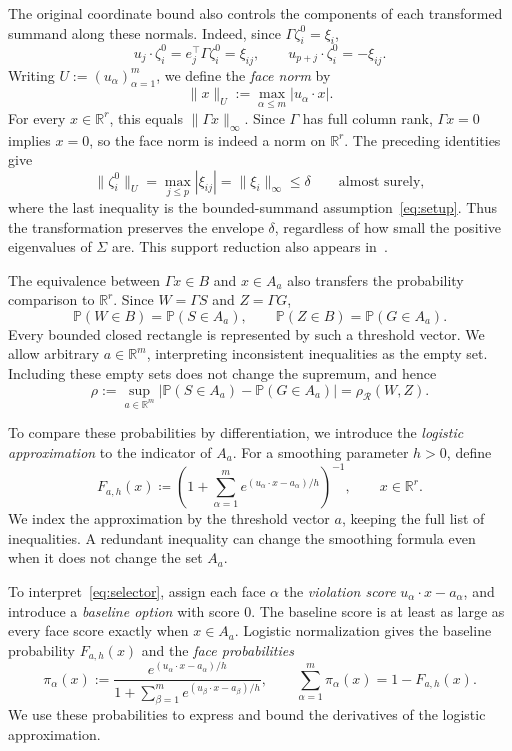 \documentclass[11pt,letterpaper]{article}
\newenvironment{recovered}{}{}
\theoremstyle{remark}
\newcommand{\Pp}{\mathbb P}
\newcommand{\R}{\mathbb R}
\newcommand{\rh}{\rho_{\mathcal R}}
\begin{document}
The original coordinate bound also controls the components of each
transformed summand along these normals. Indeed, since
\(\Gamma\zeta_i^0=\xi_i\),
\[
 u_j\cdot\zeta_i^0=e_j^\top\Gamma\zeta_i^0=\xi_{ij},
 \qquad u_{p+j}\cdot\zeta_i^0=-\xi_{ij}.
\]
Writing \(U:=(u_\alpha)_{\alpha=1}^m\), we define the \emph{face norm} by
\[
 \|x\|_U:=\max_{\alpha\le m}|u_\alpha\cdot x|.
\]
\begin{recovered}
For every \(x\in\R^r\), this equals \(\|\Gamma x\|_\infty\).
Since \(\Gamma\) has full column rank, \(\Gamma x=0\) implies \(x=0\),
so the face norm is indeed a norm on \(\R^r\).
\end{recovered}
The preceding identities give
\[
 \|\zeta_i^0\|_U=\max_{j\le p}|\xi_{ij}|
 =\|\xi_i\|_\infty\le\delta\qquad\text{almost surely},
\]
where the last inequality is the bounded-summand assumption~\eqref{eq:setup}.
Thus the transformation preserves the envelope \(\delta\), regardless
of how small the positive eigenvalues of \(\Sigma\) are. This support reduction also appears in~\cite[Section~2.3]{GaoZhang}.

\begin{recovered}
The equivalence between \(\Gamma x\in B\) and \(x\in A_a\) also
transfers the probability comparison to \(\R^r\). Since
\(W=\Gamma S\) and \(Z=\Gamma G\),
\[
 \Pp(W\in B)=\Pp(S\in A_a),\qquad
 \Pp(Z\in B)=\Pp(G\in A_a).
\]
Every bounded closed rectangle is represented by such a threshold
vector. We allow arbitrary \(a\in\R^m\), interpreting inconsistent
inequalities as the empty set. Including these empty sets does not
change the supremum, and hence
\[
 \rho:=\sup_{a\in\R^m}
 |\Pp(S\in A_a)-\Pp(G\in A_a)|=\rh(W,Z).
\]
\end{recovered}

To compare these probabilities by differentiation, we introduce the
\emph{logistic approximation} to the indicator of \(A_a\). For a smoothing
parameter \(h>0\), define
\begin{equation}
 F_{a,h}(x)\coloneqq
 \left(1+\sum_{\alpha=1}^m
 e^{(u_\alpha\cdot x-a_\alpha)/h}\right)^{-1},
 \qquad x\in\R^r.
 \label{eq:selector}
\end{equation}
\begin{recovered}
We index the approximation by the threshold vector \(a\), keeping the
full list of inequalities. A redundant inequality can change the
smoothing formula even when it does not change the set \(A_a\).
\end{recovered}

{
To interpret~\eqref{eq:selector}, assign each face \(\alpha\) the
\emph{violation score} \(u_\alpha\cdot x-a_\alpha\), and introduce a
\emph{baseline option} with score \(0\). The baseline score is at least
as large as every face score exactly when \(x\in A_a\). Logistic
normalization gives the baseline probability \(F_{a,h}(x)\) and the
\emph{face probabilities}
\[
 \pi_\alpha(x):=
 \frac{e^{(u_\alpha\cdot x-a_\alpha)/h}}
 {1+\sum_{\beta=1}^m e^{(u_\beta\cdot x-a_\beta)/h}},
 \qquad \sum_{\alpha=1}^m\pi_\alpha(x)=1-F_{a,h}(x).
\]
We use these probabilities to express and bound the derivatives of
the logistic approximation.
}
\end{document}

